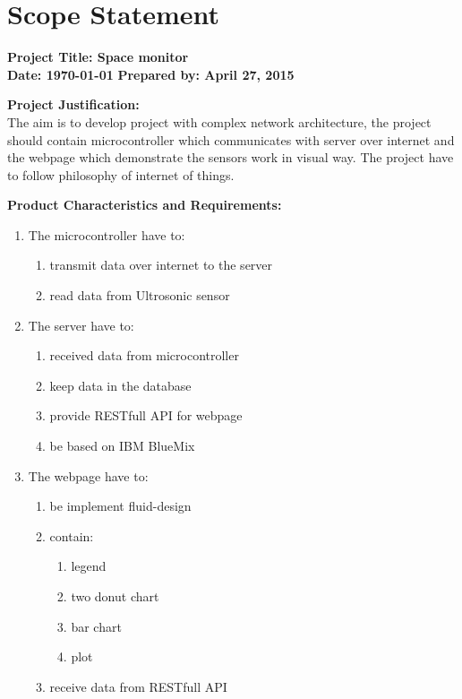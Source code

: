 \documentclass[english]{article}
\begin{document}
\section{Scope Statement}
\begin{framed}
\textbf{Project Title:  Space monitor } \\
\textbf{Date: \today}
\textbf{Prepared by: April 27, 2015 }
\end{framed}
\begin{framed}
  \textbf{Project Justification:} \\
  The aim is to develop project with complex network architecture, the project should contain microcontroller which communicates with server over internet and the webpage which demonstrate the sensors work in visual way. The project have to follow philosophy of internet of things.
  \end{framed}
  \begin{framed}
   \textbf{Product Characteristics and Requirements:}
\begin{enumerate}
  \item The microcontroller have to:
  \begin{enumerate}
  \item transmit data over internet to the server
  \item read data from Ultrosonic sensor 
	\end{enumerate}
  \item The server have to:
    \begin{enumerate}
  \item received data from microcontroller
  \item keep data in the database
  \item provide RESTfull API for webpage
  \item be based on IBM BlueMix
	\end{enumerate}
  \item The webpage have to:
    \begin{enumerate}
  \item be implement fluid-design 
  \item contain:
  \begin{enumerate}
  \item legend
  \item two donut chart
  \item bar chart
  \item plot
	\end{enumerate}
  \item receive data from RESTfull API
	\end{enumerate}
\end{enumerate}
  \end{framed}
\end{document}
